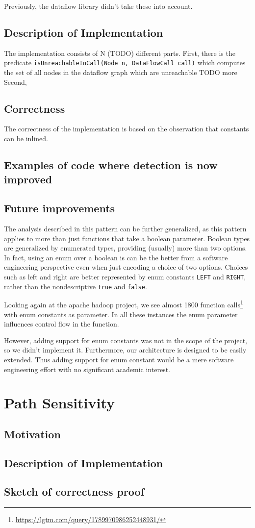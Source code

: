 Previously, the dataflow library didn't take these into account.


\subsection{Description of Implementation}
The implementation consists of N (TODO) different parts.
First, there is the predicate \texttt{isUnreachableInCall(Node n, DataFlowCall call)} which
computes the set of all nodes in the dataflow graph which are unreachable
TODO more
Second, 
\subsection{Correctness}
The correctness of the implementation is based on the observation that constants can be
inlined.

\subsection{Examples of code where detection is now improved}
\subsection{Future improvements}
The analysis described in this pattern can be further generalized, as
this pattern applies to more than just functions that take a boolean parameter.
Boolean types are generalized by enumerated types, providing (usually) more than two options.
In fact, using an enum over a boolean is can be the better from a software engineering perspective
even when just encoding a choice of two options.
Choices such as left and right are better represented 
by enum constants \texttt{LEFT} and \texttt{RIGHT}, rather than the 
nondescriptive \texttt{true} and \texttt{false}.

Looking again at the apache hadoop project, we see almost 1800
function calls\footnote{\url{https://lgtm.com/query/1789970986252448931/}} with enum constants as parameter.
In all these instances the enum parameter influences control flow in the function.

However, adding support for enum constants was not in the scope of the project, so we didn't implement it.
Furthermore, our architecture is designed to be easily extended.
Thus adding support for enum constant would be a mere software engineering effort
with no significant academic interest.


\newpage
\section{Path Sensitivity}
\subsection{Motivation}
\subsection{Description of Implementation}
\subsection{Sketch of correctness proof}




